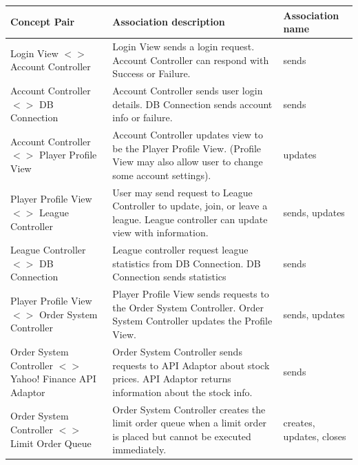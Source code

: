 \begin{centering}
\renewcommand\arraystretch{1.3}
\label{UC-3}
\begin{longtable}{|p{1.75in}| p{3in}| p{1.75in} |}
\hline
\bfseries{\color{color1}Concept Pair} &
          \bfseries{\color{color1}Association description} &
          \bfseries{\color{color1}Association name} \\ \hline

           Login View $<>$ Account Controller &
           Login View sends a login request. Account Controller can respond with Success
           or Failure. &
           sends \\ \hline

           Account Controller $<>$ DB Connection
           & Account Controller sends user login details. DB Connection sends account
           info or failure.
           & sends \\ \hline

           Account Controller $<>$ Player Profile View
           & Account Controller updates view to be the Player Profile View. (Profile
           View may also allow user to change some account settings).
           & updates \\ \hline

           Player Profile View $<>$ League Controller
           & User may send request to League Controller to update, join, or leave a league.
           League controller can update view with information.
           & sends, updates \\ \hline

           League Controller $<>$ DB Connection
           & League controller request league statistics from DB Connection. DB Connection
           sends statistics
           & sends \\ \hline

           Player Profile View $<>$ Order System Controller
           & Player Profile View sends requests to the Order System Controller.
           Order System Controller updates the Profile View.\
           & sends, updates \\ \hline

           Order System Controller $<>$ Yahoo! Finance API Adaptor
           & Order System Controller sends requests to API Adaptor about stock prices.
           API Adaptor returns information about the stock info.
           & sends \\ \hline

           Order System Controller $<>$ Limit Order Queue
           & Order System Controller creates the limit order queue when a limit order
           is placed but cannot be executed immediately.
           & creates, updates, closes\\ \hline

\end{longtable}
\end{centering}

